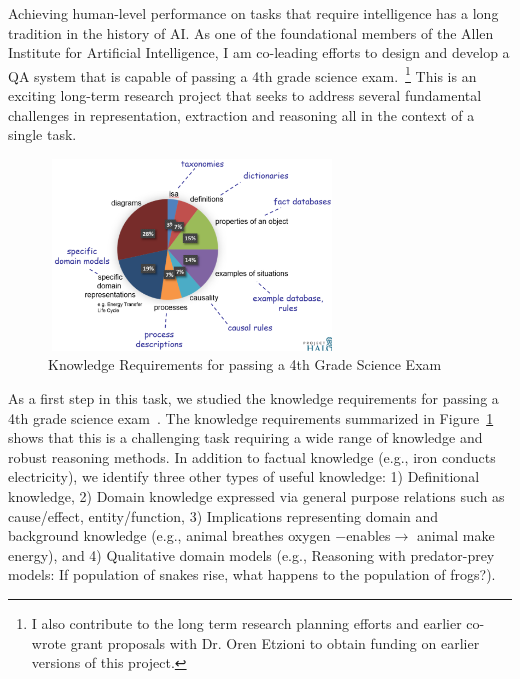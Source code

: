 \documentclass[a4paper,11pt,onecolumn]{article}
\begin{document}
Achieving human-level performance on tasks that require intelligence has a long tradition in the history of AI. As one of the foundational members of the Allen Institute for Artificial Intelligence, I am co-leading efforts to design and develop a QA system that is capable of passing a 4th grade science exam.~\footnote{I also contribute to the long term research planning efforts and earlier co-wrote grant proposals with Dr. Oren Etzioni to obtain funding on earlier versions of this project.} This is an exciting long-term research project that seeks to address several fundamental challenges in representation, extraction and reasoning all in the context of a single task. 
\begin{figure}
	\begin{center}
	\includegraphics[width=3in,height=2in]{figures/akbc} 	
	\vspace{-2ex}
	\caption{\label{fig:akbc} {\small Knowledge Requirements for passing a 4th Grade Science Exam}}
	\vspace{-2ex}
	\end{center}
\end{figure}

As a first step in this task, we studied the knowledge requirements for passing a 4th grade science exam~\cite{clark-akbc13}. The knowledge requirements summarized in Figure~\ref{fig:akbc} shows that this is a challenging task requiring a wide range of knowledge and robust reasoning methods. In addition to factual knowledge (e.g., iron conducts electricity), we identify three other types of useful knowledge: 1) Definitional knowledge, 2) Domain knowledge expressed via general purpose relations such as cause/effect, entity/function, 3) Implications representing domain and background knowledge (e.g., animal breathes oxygen $-$enables$\rightarrow$ animal make energy), and 4) Qualitative domain models (e.g., Reasoning with predator-prey models: If population of snakes rise, what happens to the population of frogs?).
\end{document}
